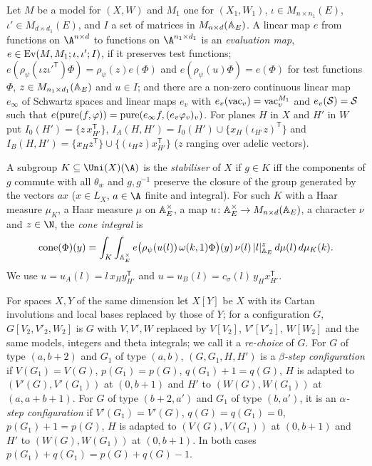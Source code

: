 \begin{definition}\label{pf:thmK:def:ev}
Let $M$ be a model for $(X,W)$ and $M_1$ one for $(X_1,W_1)$, $\iota\in M_{n\times n_1}(E)$, $\iota'\in
M_{d\times d_1}(E)$, and $I$ a set of matrices in $M_{n\times d}(\mathbb{A}_E)$. A linear map $e$ from functions on
$\A^{n\times d}$ to functions on $\A^{n_1\times d_1}$ is an \emph{evaluation map}, $e\in\operatorname{Ev}(M,M_1;\iota,\iota';I)$,
if it preserves test functions; $e(\rho_\psi(\iota z\iota'^{\mathsf T})\Phi)=\rho_\psi(z)e(\Phi)$ and
$e(\rho_\psi(u)\Phi)=e(\Phi)$ for test functions $\Phi$, $z\in M_{n_1\times d_1}(\mathbb{A}_E)$ and $u\in I$; and there are a
non-zero continuous linear map $e_\infty$ of Schwartz spaces and linear maps $e_v$ with $e_v(\mathrm{vac}_v)=\mathrm{vac}^{M_1}_v$
and $e_v(\mathcal{S})=\mathcal{S}$ such that $e(\operatorname{pure}(f,\varphi))=\operatorname{pure}(e_\infty f,(e_v\varphi_v)_v)$. For planes $H$ in $X$
and $H'$ in $W$ put $I_0(H')=\{z\,x_{H'}^{\mathsf T}\}$, $I_A(H,H')=I_0(H')\cup\{x_H(\iota_{H'}z)^{\mathsf T}\}$ and
$I_B(H,H')=\{x_Hz^{\mathsf T}\}\cup\{(\iota_Hz)x_{H'}^{\mathsf T}\}$ ($z$ ranging over adelic vectors).

A subgroup $K\subseteq\Uni(X)(\A)$ is the \emph{stabiliser} of $X$ if $g\in K$ iff the components of $g$ commute with all
$\theta_w$ and $g,g^{-1}$ preserve the closure of the group generated by the vectors $ax$ ($x\in L_X$, $a\in\A$ finite and
integral). For such $K$ with a Haar measure $\mu_K$, a Haar measure $\mu$ on $\mathbb{A}_E^\times$, a map
$u\colon\mathbb{A}_E^\times\to M_{n\times d}(\mathbb{A}_E)$, a character $\nu$ and $z\in\N$, the \emph{cone integral} is
\begin{equation}\label{pf:thmK:eq:cone}
\operatorname{cone}(\Phi)(y)=\int_K\int_{\mathbb{A}_E^\times}e\bigl(\rho_\psi(u(l))\,\omega(k,1)\Phi\bigr)(y)\,\nu(l)\,|l|^z_{\mathbb{A}_E}
\,d\mu(l)\,d\mu_K(k).
\end{equation}
We use $u=u_A(l)=l\,x_Hy_{H'}^{\mathsf T}$ and $u=u_B(l)=c_\sigma(l)\,y_Hx_{H'}^{\mathsf T}$.
\end{definition}

\begin{definition}\label{pf:thmK:def:cfg}
For spaces $X,Y$ of the same dimension let $X[Y]$ be $X$ with its Cartan involutions and local bases replaced by those of
$Y$; for a configuration $G$, $G[V_2,V'_2,W_2]$ is $G$ with $V,V',W$ replaced by $V[V_2]$, $V'[V'_2]$, $W[W_2]$ and the same
models, integers and theta integrals; we call it a \emph{re-choice} of $G$. For $G$ of type $(a,b+2)$ and $G_1$ of type
$(a,b)$, $(G,G_1,H,H')$ is a \emph{$\beta$-step configuration} if $V(G_1)=V(G)$, $p(G_1)=p(G)$, $q(G_1)+1=q(G)$, $H$ is
adapted to $(V'(G),V'(G_1))$ at $(0,b+1)$ and $H'$ to $(W(G),W(G_1))$ at $(a,a+b+1)$. For $G$ of type $(b+2,a')$ and $G_1$
of type $(b,a')$, it is an \emph{$\alpha$-step configuration} if $V'(G_1)=V'(G)$, $q(G)=q(G_1)=0$, $p(G_1)+1=p(G)$, $H$ is
adapted to $(V(G),V(G_1))$ at $(0,b+1)$ and $H'$ to $(W(G),W(G_1))$ at $(0,b+1)$. In both cases
$p(G_1)+q(G_1)=p(G)+q(G)-1$.
\end{definition}

